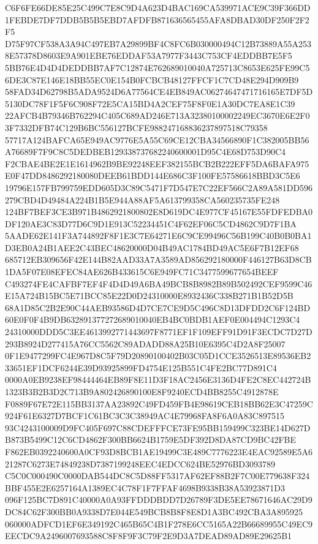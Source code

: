 \documentclass[UTF8,fontset=fandol,zihao=-4,a4paper]{ctexart}
\begin{document}
{{C6F6FE66DE85E25C499C7E8C9D4A623D4BAC169CA539971ACE9C39F366DD1FEBDE7DF7DDB5B5B5EBD7AFDFB871636565455AFA8DBAD30DF250F2F2F5
D75F97CF538A3A94C497EB7A29899BF4C8FC6B030000494C12B73889A55A2538E57378D8603E9A901EBE76EDDAF53A7977F3443C753CF4EDDBB7E5F5
5BB76E4D4D4DEDDBB7AF7C12874E762689010040A725713C8653E625FE99C56DE3C87E146E18BB55EC0E154B0FCBCB48127FFCF1C7CD48E294D909B9
58FAD34D62798B5ADA9524D6A77564CE4EB849AC06274647471716165E7DF5D5130DC78F1F5F6C908F72E5CA15BD4A2CEF75F8F0E1A30DC7EA8E1C39
22AFCB4B79346B762294C405C689AD246E713A32380100002249EC3670E6E2F03F7332DFB74C129B6BC556127BCFE988247168836237897518C79358
57717A124BAFCA65E949AC9776E5A55C69CE12CBA34566890F1C382005BB56A76689F7F9C8C5DEDBEB129338737682240600001D95C4E68D753D90C4
F2CBAE4BE2E1E1614962B9BE92248EEF382155BCB2B222EFF5DA6BAFA975E0F47DD8486292180080DEEB61BDD144E686C3F100FE57586618BBD3C5E6
19796E157FB799759EDD605D3C89C5471F7D547E7C22EF566C2A89A581DD596279CBD4D49484A224B1B5E944A88AF5A613799358CA560235735FE248
124BF7BEF3CE3B971B4862921800802E8D619DC4E977CF45167E55FDFEDBA0DF120AE3C83D77D6C9D1E913C52234451C4F62EF06C5CD4862C9D7F1BA
5AADE62E141F3A744892F8F1E3C7E64271E6C9CE99496C56B199C40B0B0BA1D3EB0A24B1AEE2C43BEC48620000D04B49AC1784BD49AC5E6F7B12EF68
685712EB309656F42E144B82AAD33A7A3589AD856292180000F446127B63D8CB1DA5F07E08EFEC84AE626B433615C6E949FC71C3477599677654BEEF
C493274FE4CAFBF7EF4F4D4D49A6BA49BCB8B8982B89B502492CEF9599C46E15A724B15BC5E71BCC85E22D0D24310000E8932436C338B271B1B52D5B
68A1D85C2B2E90C44AEB93586D4D7CE7CE9D5C496C8D13DFDD2C6F124BD60E0F0F4B9DB632891377272689010040EB4BC0BDB1AEF0E004494C1293C4
24310000DDD5C3EE4613992771443697F8771EF1F109EFF91D91F3ECDC7D27D293B8924D277415A76CC5562C89ADADD88A25B10E6395C4D2A8F25007
0F1E9477299FC4E967D8C5F79D20890100402B03C05D1CCE3526513E89536EB233651EF1DCF6244E39D93925899FD4754E125B551C4FE2BC77D891C4
0000A0EB9238EF98444464EB89F8E11D3F18AC2456E3136D4FE2C8EC442724B1323B3B2B3D2C713B9A802426890100E8F9240ECD4BB8255C4912878E
F0889F67E72E115BB3137AA23892C49FD459FB4E98619CEB18BB62E3C47259C924F61E6327D7BCF1C61BC3C3C38949AC4E79968FA8F6A0A83C897515
93C4243100009D9FC405F697C88CDEFFFCE73FE95BB159499C323BE14D627DB873B5499C12C6CD4862F300BB6624B1759E5DF392D8DA87CD9BC42FBE
F862EB0392240600A0CF93D8BCB1AE19499C3E489C7776223E4EAC92589E5A621287C6273E74849238D7387199248EEC4EDCC624BE52976BD3093789
C5C0C000490C0000DAB544DC8C5D88FF5317AF62EF88B2F7C00E779638F324BBF455E2E6257164A1389EC4C78F1F7FFAF4698B9338B38A53923871D3
096F125BC7D891C40000A0A93FFDDDBDD7D26789F3DE5EE78671646AC29D9DC84C62F300BB0A9338D7E044E549BCB8B8F8E8D1A3BC492CBA3A895925
060000ADFCD1EF6E349192C465B65C4B1F278E6CC5165A22B66689955C49EC9EECDC9A2496007693588C8F8F9F3C79F2E9D3A7DEAD89AD89E29625B1
}}
\end{document}

